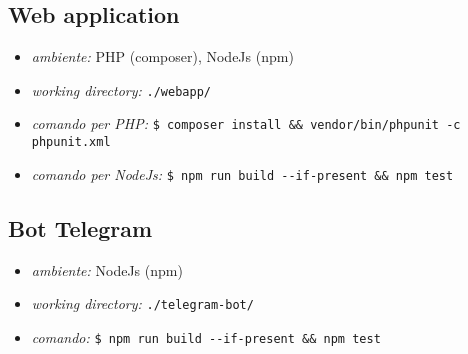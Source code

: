	\subsection{Web application}

		\begin{itemize}
			\item \textit{ambiente:} PHP (composer), NodeJs (npm)
			\item \textit{working directory:} \verb!./webapp/!
			\item \textit{comando per PHP:} \verb!$ composer install && vendor/bin/phpunit -c phpunit.xml!
			\item \textit{comando per NodeJs:} \verb!$ npm run build --if-present && npm test !
		\end{itemize}

	\subsection{Bot Telegram}

		\begin{itemize}
			\item \textit{ambiente:} NodeJs (npm)
			\item \textit{working directory:} \verb!./telegram-bot/!
			\item \textit{comando:} \verb!$ npm run build --if-present && npm test!
		\end{itemize}
		
